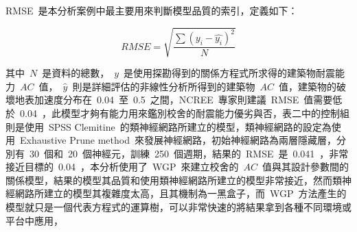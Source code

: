RMSE~是本分析案例中最主要用來判斷模型品質的索引，定義如下：


\begin{equation} RMSE = \sqrt{\dfrac{\sum{(y_i - \hat{y_i})^2}}{N}} \label{eq:RMSE}\end{equation}

其中~$N$~是資料的總數，~$y$~是使用探勘得到的關係方程式所求得的建築物耐震能力~$AC$~值，~$\hat{y}$~則是詳細評估的非線性分析所得到的建築物~$AC$~值，建築物的破壞地表加速度分布在~0.04~至~0.5~之間，NCREE~專家則建議~RMSE~值需要低於~0.04~，此模型才夠有能力用來鑑別校舍的耐震能力優劣與否，表二中的控制組則是使用~SPSS Clemitine~的類神經網路所建立的模型，類神經網路的設定為使用~Exhaustive Prune method~來發展神經網路，初始神經網路為兩層隱藏層，分別有~30~個和~20~個神經元，訓練~250~個週期，結果的~RMSE~是~0.041~，非常接近目標的~0.04~，本分析使用了~WGP~來建立校舍的~$AC$~值與其設計參數間的關係模型，結果的模型其品質和使用類神經網路所建立的模型非常接近，然而類神經網路所建立的模型其複雜度太高，且其機制為一黑盒子，而~WGP~方法產生的模型就只是一個代表方程式的運算樹，可以非常快速的將結果拿到各種不同環境或平台中應用，


